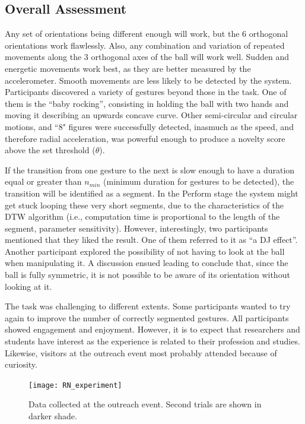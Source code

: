 \documentclass{nime-alternate_ADJ} %
\begin{document}
\subsection{Overall Assessment}

Any set of orientations being different enough will work, but the 6 orthogonal orientations work flawlessly. Also, any combination and variation of repeated movements along the 3 orthogonal axes of the ball will work well. Sudden and energetic movements work best, as they are better measured by the accelerometer. Smooth movements are less likely to be detected by the system. Participants discovered a variety of gestures beyond those in the task. One of them is the “baby rocking”, consisting in holding the ball with two hands and moving it describing an upwards concave curve. Other semi-circular and circular motions, and ``8" figures were successfully detected, inasmuch as the speed, and therefore radial acceleration, was powerful enough to produce a novelty score above the set threshold ($\theta $).

If the transition from one gesture to the next is slow enough to have a duration equal or greater than $n_{min}$ (minimum duration for gestures to be detected), the transition will be identified as a segment. In the Perform stage the system might get stuck looping these very short segments, due to the characteristics of the DTW algorithm (i.e., computation time is proportional to the length of the segment, parameter sensitivity). However, interestingly, two participants mentioned that they liked the result. One of them referred to it as “a DJ effect”. Another participant explored the possibility of not having to look at the ball when manipulating it. A discussion ensued leading to conclude that, since the ball is fully symmetric, it is not possible to be aware of its orientation without looking at it.

The task was challenging to different extents. Some participants wanted to try again to improve the number of correctly segmented gestures. All participants showed engagement and enjoyment. However, it is to expect that researchers and students have interest as the experience is related to their profession and studies. Likewise, visitors at the outreach event most probably attended because of curiosity.

\begin{figure}[t!]
	\centering
		\texttt{[image: RN\_experiment]}
	\caption{Data collected at the outreach event. Second trials are shown in darker shade.}
	\label{fig_7}
\end{figure}
\end{document}
